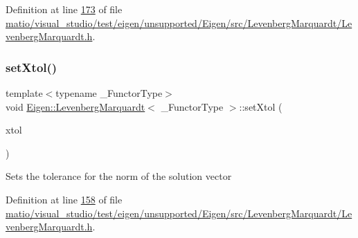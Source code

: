 Definition at line \hyperlink{matio_2visual__studio_2test_2eigen_2unsupported_2_eigen_2src_2_levenberg_marquardt_2_levenberg_marquardt_8h_source_l00173}{173} of file \hyperlink{matio_2visual__studio_2test_2eigen_2unsupported_2_eigen_2src_2_levenberg_marquardt_2_levenberg_marquardt_8h_source}{matio/visual\+\_\+studio/test/eigen/unsupported/\+Eigen/src/\+Levenberg\+Marquardt/\+Levenberg\+Marquardt.\+h}.

\mbox{\label{class_eigen_1_1_levenberg_marquardt_a691b571366630f1329d2de7a5e40e7a5}} 
\subsubsection{\texorpdfstring{set\+Xtol()}{setXtol()}\hspace{0.1cm}{\footnotesize\ttfamily [1/2]}}
{\footnotesize\ttfamily template$<$typename \+\_\+\+Functor\+Type$>$ \\
void \hyperlink{class_eigen_1_1_levenberg_marquardt}{Eigen\+::\+Levenberg\+Marquardt}$<$ \+\_\+\+Functor\+Type $>$\+::set\+Xtol (\begin{DoxyParamCaption}\item[{Real\+Scalar}]{xtol }\end{DoxyParamCaption})\hspace{0.3cm}{\ttfamily [inline]}}

Sets the tolerance for the norm of the solution vector 

Definition at line \hyperlink{matio_2visual__studio_2test_2eigen_2unsupported_2_eigen_2src_2_levenberg_marquardt_2_levenberg_marquardt_8h_source_l00158}{158} of file \hyperlink{matio_2visual__studio_2test_2eigen_2unsupported_2_eigen_2src_2_levenberg_marquardt_2_levenberg_marquardt_8h_source}{matio/visual\+\_\+studio/test/eigen/unsupported/\+Eigen/src/\+Levenberg\+Marquardt/\+Levenberg\+Marquardt.\+h}.

\mbox{\label{class_eigen_1_1_levenberg_marquardt_a691b571366630f1329d2de7a5e40e7a5}} 

